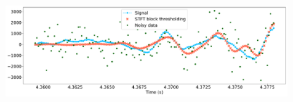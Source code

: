 \documentclass[12pt,twoside]{article}
\begin{document}
\begin{enumerate}
\begin{figure}[H]
	\end{figure}
	\begin{figure}[H]
		\centering
		\captionsetup{justification=centering}
        		\includegraphics[width=300pt]{code/STFT/plots/stft_block_denoised_0_zoom}
	\end{figure}

 \end{enumerate}
\end{document}
